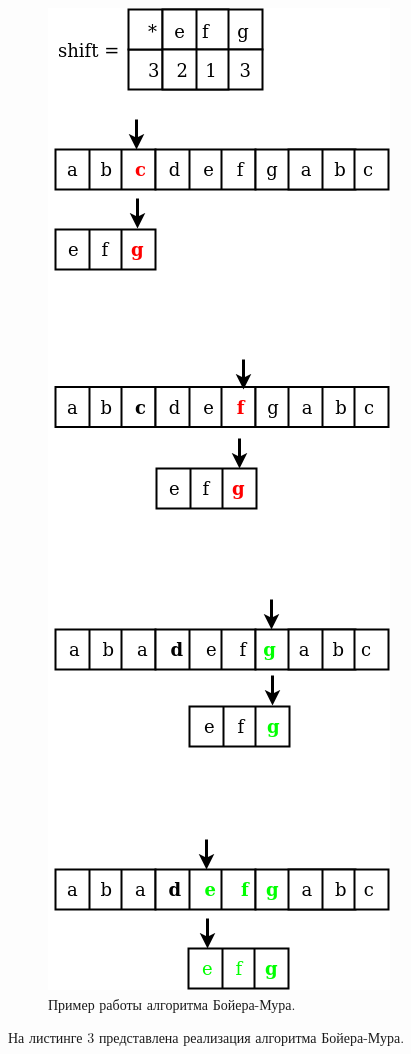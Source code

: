\documentclass[a4paper,12pt]{article}
\begin{document}
\begin{figure}[H]	
			 	{
			 		\centering
			 		\includegraphics[scale=0.48]{3.png}
			 		\caption{Пример работы алгоритма Бойера-Мура.}
			 		\label{pic:ant_schema}
			 	}
			 \end{figure}
На листинге 3 представлена реализация алгоритма Бойера-Мура.
\end{document}
